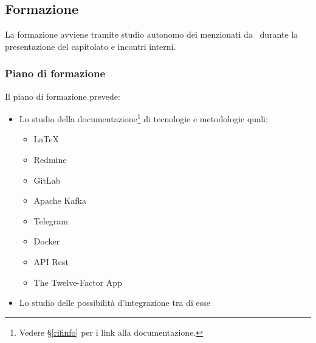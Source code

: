 	\subsection{Formazione}

		La formazione avviene tramite studio autonomo dei  menzionati da \II\ durante la presentazione del capitolato e incontri interni.

		\subsubsection{Piano di formazione}
		Il piano di formazione prevede:
		\begin{itemize}
			\item Lo studio della documentazione\footnote{Vedere \S\ref{rifinfo} per i link alla documentazione.} di tecnologie e metodologie quali:
			\begin{itemize}
				\item \LaTeX
				\item Redmine
				\item GitLab
				\item Apache Kafka
				\item Telegram
				\item Docker
				\item API Rest
				\item The Twelve-Factor App
			\end{itemize}
			\item Lo studio delle possibilità d'integrazione tra di esse
		\end{itemize}
